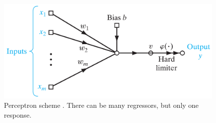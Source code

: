 \begin{figure}[!htb]
\centering
\includegraphics[width=.80\columnwidth]{images/064perceptron}
\caption[Perceptron scheme]{Perceptron scheme \cite{RefWorks:158}.
There can be many regressors, but only one response.}
\label{fig:064perceptron}
\end{figure}